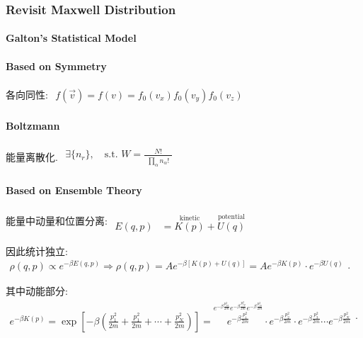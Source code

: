 \documentclass[../../main.tex]{subfiles}
\begin{document}
\subsubsection{Revisit Maxwell Distribution}
\paragraph{Galton's Statistical Model}
\paragraph{Based on Symmetry} 各向同性: $\begin{aligned}
    f\left(\vec{v}\right) = f(v) = f_{0}(v_{x})f_{0}(v_{y})f_{0}(v_{z})
\end{aligned}$
\paragraph{Boltzmann} 能量离散化. $\begin{aligned}
    \exists \{n_{r}\},\quad \text{s.t. }W = \frac{N!}{\begin{aligned}
        \prod_{\alpha}n_{\alpha}!
    \end{aligned}}
\end{aligned}$
\paragraph{Based on Ensemble Theory} 能量中动量和位置分离: $\begin{aligned}
    E(q,p) &= \stackrel{\text{kinetic}}{K(p)} + \stackrel{\text{potential}}{U(q)}
\end{aligned}$

因此统计独立: $\begin{aligned}
    \rho(q,p) \propto e^{-\beta E(q,p)}\Rightarrow \rho(q,p) = Ae^{-\beta [K(p)+U(q)]} = Ae^{-\beta K(p)}\cdot e^{-\beta U(q)}
\end{aligned}$. 

其中动能部分: $\begin{aligned}
    e^{-\beta K(p)} 
    = \exp\left[-\beta\left(\frac{p_{1}^{2}}{2m} + \frac{p_{1}^{2}}{2m} + \cdots + \frac{p_{N}^{2}}{2m}\right)\right] 
    = \stackrel{e^{-\beta\frac{p_{1x}^{2}}{2m}}e^{-\beta\frac{p_{1y}^{2}}{2m}}e^{-\beta\frac{p_{1z}^{2}}{2m}}}{e^{-\beta\frac{p_{1}^{2}}{2m}}}\cdot e^{-\beta\frac{p_{2}^{2}}{2m}}\cdot e^{-\beta\frac{p_{3}^{2}}{2m}}\cdots e^{-\beta\frac{p_{N}^{2}}{2m}}
\end{aligned}$.
\end{document}
